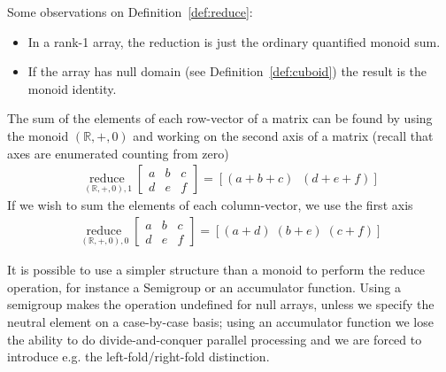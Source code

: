 \documentclass{DIKU-report-variant}
\newcommand\mrm[1]{\mathrm{#1}}
\newcommand\brm[1]{\bm{\mrm{#1}}}
\newcommand\Real{\mathbb{R}}
\newcommand\reduce{\operatorname*{\brm{reduce}\,}}
\begin{document}
\begin{observation}
  \label{ob:reduce} Some observations on Definition~\ref{def:reduce}:

  \begin{itemize}
    \item In a rank-1 array, the reduction is just the ordinary quantified monoid sum.
    \item If the array has null domain (see Definition~\ref{def:cuboid}) the result is
    the monoid identity.
  \end{itemize}
\end{observation}

\begin{example}
  \label{ex:reduce}
  The sum of the elements of each row-vector of a matrix can be found by using the monoid \((\Real, +, 0)\)
  and working on the second axis of a matrix (recall that axes are enumerated counting from zero)
  \begin{align*}
    \reduce_{(\Real, +, 0), 1} \begin{bmatrix}
      a & b & c \\
      d & e & f
    \end{bmatrix} = [(a + b + c)\;\;(d + e + f)]
  \end{align*}
  If we wish to sum the elements of each column-vector, we use the first axis
  \begin{align*}
    \reduce_{(\Real, +, 0), 0} \begin{bmatrix}
      a & b & c \\
      d & e & f
    \end{bmatrix} = [(a + d)\;(b + e)\;(c + f)]
  \end{align*}
\end{example}

\begin{remark}
  \label{rem:reduce}
  It is possible to use a simpler structure than a monoid to perform
  the reduce operation, for instance a Semigroup or an accumulator function. Using a semigroup
  makes the operation undefined for null arrays, unless we specify the neutral element
  on a case-by-case basis; using an accumulator function we lose the ability to do divide-and-conquer
  parallel processing and we are forced to introduce e.g. the left-fold/right-fold distinction.
\end{remark}
\end{document}
